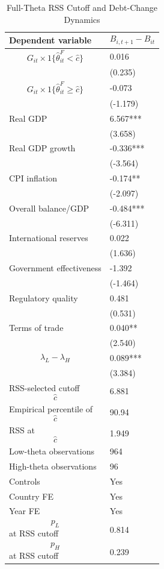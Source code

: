 \begin{table}[H]\centering
\begin{threeparttable}
\caption{Full-Theta RSS Cutoff and Debt-Change Dynamics}
\label{tab:deltaB_rss_cutoff_fulltheta}
\scriptsize
\begin{tabularx}{\textwidth}{lY}
\toprule
Dependent variable & $$B_{i,t+1}-B_{it}$$ \\
\midrule
$$G_{it}\times 1\{\widehat{\theta}^{F}_{it}<\widehat{c}\}$$ & 0.016 \\
 & (0.235) \\
$$G_{it}\times 1\{\widehat{\theta}^{F}_{it}\geq\widehat{c}\}$$ & -0.073 \\
 & (-1.179) \\
Real GDP & 6.567*** \\
 & (3.658) \\
Real GDP growth & -0.336*** \\
 & (-3.564) \\
CPI inflation & -0.174** \\
 & (-2.097) \\
Overall balance/GDP & -0.484*** \\
 & (-6.311) \\
International reserves & 0.022 \\
 & (1.636) \\
Government effectiveness & -1.392 \\
 & (-1.464) \\
Regulatory quality & 0.481 \\
 & (0.531) \\
Terms of trade & 0.040** \\
 & (2.540) \\
$$\lambda_L-\lambda_H$$ & 0.089*** \\
 & (3.384) \\
\midrule
RSS-selected cutoff $$\widehat{c}$$ & 6.881 \\
Empirical percentile of $$\widehat{c}$$ & 90.94 \\
RSS at $$\widehat{c}$$ & 1.949 \\
Low-theta observations & 964 \\
High-theta observations & 96 \\
Controls & Yes \\
Country FE & Yes \\
Year FE & Yes \\
$$p_L$$ at RSS cutoff & 0.814 \\
$$p_H$$ at RSS cutoff & 0.239 \\

\end{tabularx}
\end{threeparttable}
\end{table}
